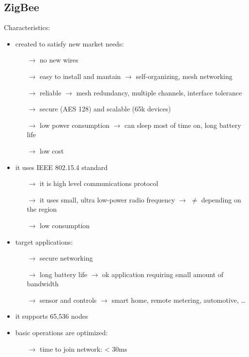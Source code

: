 \subsection{ZigBee}
Characteristics:
\begin{itemize}
    \item created to satisfy new market needs:
    \begin{itemize}
        \item[$\rightarrow$] no new wires
        \item[$\rightarrow$] easy to install and mantain $\rightarrow$ self-organizing, mesh networking
        \item[$\rightarrow$] reliable $\rightarrow$ mesh redundancy, multiple channels, interface tolerance
        \item[$\rightarrow$] secure (AES 128) and scalable (65k devices)
        \item[$\rightarrow$] low power consumption $\rightarrow$ can sleep most of time on, long battery life
        \item[$\rightarrow$] low cost 
    \end{itemize}
    \item it uses IEEE 802.15.4 standard
    \begin{itemize}
        \item[$\rightarrow$] it is high level communications protocol
        \item[$\rightarrow$] it uses small, ultra low-power radio frequency $\rightarrow$ $\neq$ depending on the region
        \item[$\rightarrow$] low consumption 
    \end{itemize}
    \item target applications:
    \begin{itemize}
        \item[$\rightarrow$] secure networking
        \item[$\rightarrow$] long battery life $\rightarrow$ ok application requiring small amount of bandwidth
        \item[$\rightarrow$] sensor and controls $\rightarrow$ smart home, remote metering, automotive, \dots
    \end{itemize}
    \item it supports 65,536 nodes
    \item basic operations are optimized:
    \begin{itemize}
        \item[$\rightarrow$] time to join network: < 30ms

\end{itemize}
\end{itemize}
